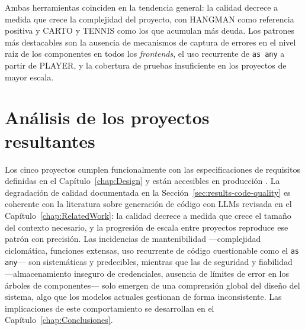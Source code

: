 Ambas herramientas coinciden en la tendencia general: la calidad decrece a medida que crece la complejidad del proyecto, con \ac{HANGMAN} como referencia positiva y \ac{CARTO} y \ac{TENNIS} como los que acumulan más deuda. Los patrones más destacables son la ausencia de mecanismos de captura de errores en el nivel raíz de los componentes en todos los \textit{frontends}, el uso recurrente de \texttt{as any} a partir de \ac{PLAYER}, y la cobertura de pruebas insuficiente en los proyectos de mayor escala.

\section{Análisis de los proyectos resultantes} \label{sec:results-analysis}

Los cinco proyectos cumplen funcionalmente con las especificaciones de requisitos definidas en el Capítulo~\ref{chap:Design} y están accesibles en producción \cite{URL::TFG-Web}. La degradación de calidad documentada en la Sección~\ref{sec:results-code-quality} es coherente con la literatura sobre generación de código con \ac{LLMs} revisada en el Capítulo~\ref{chap:RelatedWork}: la calidad decrece a medida que crece el tamaño del contexto necesario, y la progresión de escala entre proyectos reproduce ese patrón con precisión. Las incidencias de mantenibilidad —complejidad ciclomática, funciones extensas, uso recurrente de código cuestionable como el \texttt{as any}— son sistemáticas y predecibles, mientras que las de seguridad y fiabilidad —almacenamiento inseguro de credenciales, ausencia de límites de error en los árboles de componentes— solo emergen de una comprensión global del diseño del sistema, algo que los modelos actuales gestionan de forma inconsistente. Las implicaciones de este comportamiento se desarrollan en el Capítulo~\ref{chap:Conclusiones}.
